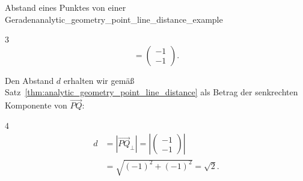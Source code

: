 \begin{ExampleBox}{Abstand eines Punktes von einer Geraden}{analytic_geometry_point_line_distance_example}
\begin{itemize}
\begin{ClozeArea}[32]{3}
\[            =\begin{pmatrix}-1\\-1\end{pmatrix}.
        \]
      \end{ClozeArea}
  \end{itemize}
  \noindent
  \begin{minipage}[c]{0.44\linewidth}
    Den Abstand $d$ erhalten wir gemäß
    Satz~\ref{thm:analytic_geometry_point_line_distance} als Betrag der
    senkrechten Komponente von $\overrightarrow{PQ}$:
    \begin{ClozeArea}[15]{4}
      \[
        \begin{aligned}
          d&=\left\lvert\overrightarrow{PQ}_{\perp}\right\rvert
            =\left\lvert\begin{pmatrix}-1\\-1\end{pmatrix}\right\rvert\\[0.6em]
           &=\sqrt{(-1)^2+(-1)^2}=\sqrt2.
        \end{aligned}
      \]
    \end{ClozeArea}
  \end{minipage}\hfill
  \begin{minipage}[c]{0.54\linewidth}
    \centering
  \end{minipage}
\end{ExampleBox}
